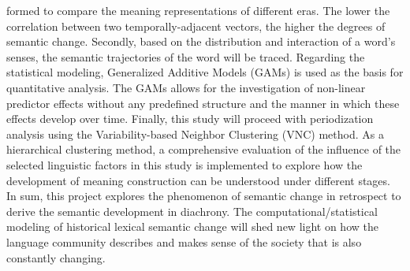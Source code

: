 formed to compare the meaning representations of different eras. The lower the correlation between two temporally-adjacent vectors, the higher the degrees of semantic change. Secondly, based on the distribution and interaction of a word's senses, the semantic trajectories of the word will be traced. Regarding the statistical modeling, Generalized Additive Models (GAMs) is used as the basis for quantitative analysis. The GAMs allows for the investigation of non-linear predictor effects without any predefined structure and the manner in which these effects develop over time. Finally, this study will proceed with periodization analysis using the Variability-based Neighbor Clustering (VNC) method. As a hierarchical clustering method, a comprehensive evaluation of the influence of the selected linguistic factors in this study is implemented to explore how the development of meaning construction can be understood under different stages. In sum, this project explores the phenomenon of semantic change in retrospect to derive the semantic development in diachrony. The computational/statistical modeling of historical lexical semantic change will shed new light on how the language community describes and makes sense of the society that is also constantly changing.

